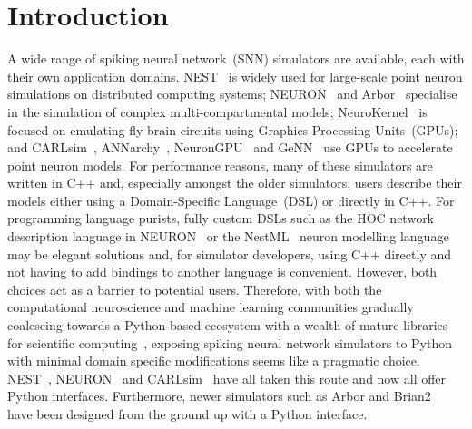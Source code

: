 \documentclass[utf8]{frontiersSCNS} %
\begin{document}
\section{Introduction}
A wide range of spiking neural network~(SNN) simulators are available, each with their own application domains. 
NEST~\citep{Gewaltig2007} is widely used for large-scale point neuron simulations on distributed computing systems; NEURON~\citep{carnevale2006neuron} and Arbor~\citep{Akar2019} specialise in the simulation of complex multi-compartmental models; NeuroKernel~\citep{Givon2016} is focused on emulating fly brain circuits using Graphics Processing Units~(GPUs); and CARLsim~\citep{Chou2018}, ANNarchy~\citep{Dinkelbach2015}, NeuronGPU~\citep{Golosio2021} and GeNN~\citep{Yavuz2016} use GPUs to accelerate point neuron models. 
For performance reasons, many of these simulators are written in C++ and, especially amongst the older simulators, users describe their models either using a Domain-Specific Language~(DSL) or directly in C++.
For programming language purists, fully custom DSLs such as the HOC network description language in NEURON~\citep{carnevale2006neuron} or the NestML~\citep{Plotnikov2016} neuron modelling language may be elegant solutions and, for simulator developers, using C++ directly and not having to add bindings to another language is convenient.
However, both choices act as a barrier to potential users.
Therefore, with both the computational neuroscience and machine learning communities gradually coalescing towards a Python-based ecosystem with a wealth of mature libraries for scientific computing~\citep{Hunter2007,VanDerWalt2011,Millman2011}, exposing spiking neural network simulators to Python with minimal domain specific modifications seems like a pragmatic choice.
NEST~\citep{Eppler2009}, NEURON~\citep{Hines2009} and CARLsim~\citep{Balaji2020} have all taken this route and now all offer Python interfaces.
Furthermore, newer simulators such as Arbor and Brian2~\citep{Stimberg2019} have been designed from the ground up with a Python interface.
\end{document}

